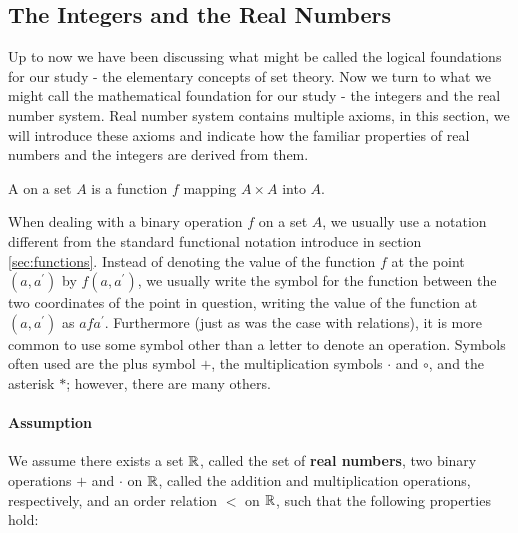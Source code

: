 \subsection{The Integers and the Real Numbers}\label{sec:the_integers_and_the_real_numbers}

Up to now we have been discussing what might be called the logical foundations for our study - the elementary concepts of set theory. Now we turn to what we might call the mathematical foundation for our study - the integers and the real number system.  Real number system contains multiple axioms, in this section, we will introduce these axioms and indicate how the familiar properties of real numbers and the integers are derived from them.

\begin{definition}
A \textbf{} on a set $A$ is a function $f$ mapping $A \times A$ into $A$.
\end{definition}

When dealing with a binary operation $f$ on a set $A$, we usually use a notation different from the standard functional notation introduce in section \ref{sec:functions}. Instead of denoting the value of the function $f$ at the point $(a, a^{\prime})$ by $f(a, a^{\prime})$, we usually write the symbol for the function between the two coordinates of the point in question, writing the value of the function at $(a, a^{\prime})$ as $afa^{\prime}$. Furthermore (just as was the case with relations), it is more common to use some symbol other than a letter to denote an operation. Symbols often used are the plus symbol $+$, the multiplication symbols $\cdot$ and $\circ$, and the asterisk $*$; however, there are many others.

\paragraph{Assumption} We assume there exists a set $\mathbb{R}$, called the set of \textbf{real numbers}, two binary operations $+$ and $\cdot$ on $\mathbb{R}$, called the addition and multiplication operations, respectively, and an order relation $<$ on $\mathbb{R}$, such that the following properties hold:

